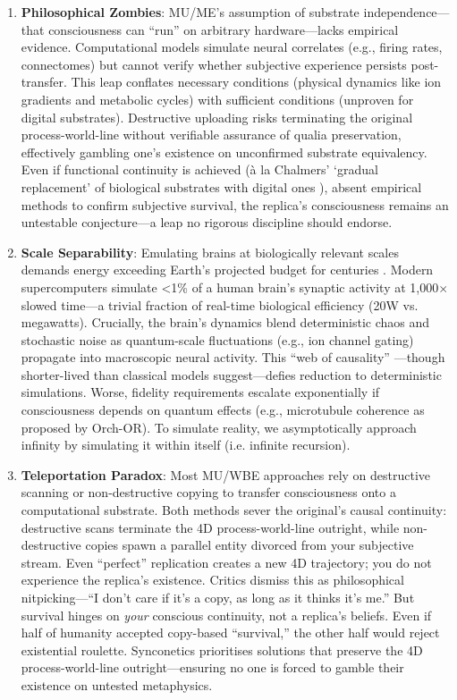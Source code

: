 \documentclass[10pt]{article}
\begin{document}
\begin{sloppypar}
  \begin{enumerate}
    \item \textbf{Philosophical Zombies}: MU/ME’s assumption of substrate independence—that consciousness can “run” on arbitrary hardware—lacks empirical evidence. Computational models simulate neural correlates (e.g., firing rates, connectomes) but cannot verify whether subjective experience persists post-transfer. This leap conflates necessary conditions (physical dynamics like ion gradients and metabolic cycles) with sufficient conditions (unproven for digital substrates). Destructive uploading risks terminating the original process-world-line without verifiable assurance of qualia preservation, effectively gambling one’s existence on unconfirmed substrate equivalency. Even if functional continuity is achieved (à la Chalmers’ ‘gradual replacement’ of biological substrates with digital ones \citep{chalmers_conscious_1998}), absent empirical methods to confirm subjective survival, the replica’s consciousness remains an untestable conjecture—a leap no rigorous discipline should endorse.

    \item \textbf{Scale Separability}: Emulating brains at biologically relevant scales demands energy exceeding Earth’s projected budget for centuries \citep{bostrom_whole_2008}. Modern supercomputers simulate <1\% of a human brain’s synaptic activity at 1,000\(\times\) slowed time—a trivial fraction of real-time biological efficiency (20W vs. megawatts). Crucially, the brain’s dynamics blend deterministic chaos and stochastic noise as quantum-scale fluctuations (e.g., ion channel gating) propagate into macroscopic neural activity. This “web of causality” \citep{watanabe_biological_2022}—though shorter-lived than classical models suggest—defies reduction to deterministic simulations. Worse, fidelity requirements escalate exponentially if consciousness depends on quantum effects (e.g., microtubule coherence as proposed by Orch-OR). To simulate reality, we asymptotically approach infinity by simulating it within itself (i.e. infinite recursion).

    \item \textbf{Teleportation Paradox}: Most MU/WBE approaches rely on destructive scanning or non-destructive copying to transfer consciousness onto a computational substrate. Both methods sever the original’s causal continuity: destructive scans terminate the 4D process-world-line outright, while non-destructive copies spawn a parallel entity divorced from your subjective stream. Even “perfect” replication creates a new 4D trajectory; you do not experience the replica’s existence. Critics dismiss this as philosophical nitpicking—“I don’t care if it’s a copy, as long as it thinks it’s me.” But survival hinges on \emph{your} conscious continuity, not a replica’s beliefs. Even if half of humanity accepted copy-based “survival,” the other half would reject existential roulette. Synconetics prioritises solutions that preserve the 4D process-world-line outright—ensuring no one is forced to gamble their existence on untested metaphysics.
  \end{enumerate}


\end{sloppypar}
\end{document}
